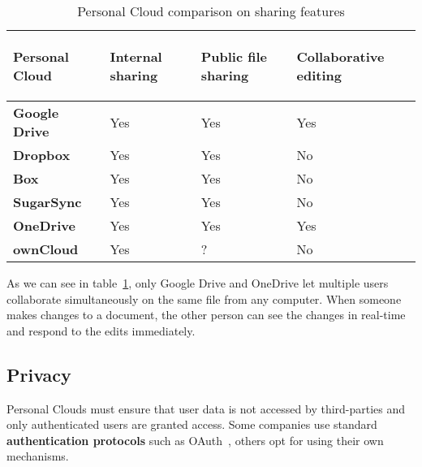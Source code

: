 {
\def\arraystretch{1.5}

\begin{table}
\begin{center}
    \begin{tabular}{ | p{3.3cm} | p{1.5cm} | p{1.5cm} | p{1.5cm} | }
    \hline
    \rowcolor[gray]{0.8}

	\textbf{Personal Cloud} &
	\begin{sideways}\textbf{Internal sharing}\end{sideways} &
	\begin{sideways}\textbf{Public file sharing}\end{sideways} &
	\begin{sideways}\textbf{Collaborative editing}\end{sideways} \\ \hline

	\textbf{Google Drive} &
	Yes &
	Yes &
	Yes \\ \hline

	\textbf{Dropbox} &
	Yes &
	Yes &
	No \\ \hline
	
	\textbf{Box} &
	Yes &
	Yes &
	No \\ \hline
	
	\textbf{SugarSync} & 
	Yes &
	Yes &
	No \\ \hline
	
	\textbf{OneDrive} & 
	Yes &
	Yes &
	Yes \\ \hline
	
	\textbf{ownCloud} &
	Yes &
	? &
	No \\ \hline

    \end{tabular}
    \caption{Personal Cloud comparison on sharing features}
    \label{tab:pc_sharing}
\end{center}
\end{table}
}

As we can see in table~\ref{tab:pc_sharing}, only Google Drive and OneDrive let multiple users collaborate simultaneously on the same file from any computer. When someone makes changes to a document, the other person can see the changes in real-time and respond to the edits immediately.

\subsection{Privacy}


Personal Clouds must ensure that user data is not accessed by third-parties and only authenticated users are granted access. Some companies use standard \textbf{authentication protocols} such as OAuth~\cite{oauth}, others opt for using their own mechanisms.

